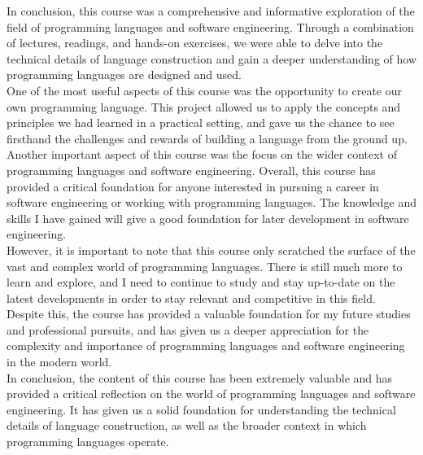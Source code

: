 \documentclass{article}
\theoremstyle{theorem}
\theoremstyle{definition}
\theoremstyle{remark}
\begin{document}
\indent	
In conclusion, this course was a comprehensive and informative exploration of the field of programming languages and software engineering. Through a combination of lectures, readings, and hands-on exercises, we were able to delve into the technical details of language construction and gain a deeper understanding of how programming languages are designed and used.
\\
\indent One of the most useful aspects of this course was the opportunity to create our own programming language. This project allowed us to apply the concepts and principles we had learned in a practical setting, and gave us the chance to see firsthand the challenges and rewards of building a language from the ground up.
Another important aspect of this course was the focus on the wider context of programming languages and software engineering.
Overall, this course has provided a critical foundation for anyone interested in pursuing a career in software engineering or working with programming languages. The knowledge and skills I have gained will give a good foundation for later development in software engineering.
	\\
 \indent
However, it is important to note that this course only scratched the surface of the vast and complex world of programming languages. There is still much more to learn and explore, and I need to continue to study and stay up-to-date on the latest developments in order to stay relevant and competitive in this field.
\\
	\indent
Despite this, the course has provided a valuable foundation for my future studies and 	professional pursuits, and has given us a deeper appreciation for the complexity and importance of programming languages and software engineering in the modern world.
\\
\indent
In conclusion, the content of this course has been extremely valuable and has provided a critical reflection on the world of programming languages and software engineering. It has given us a solid foundation for understanding the technical details of language construction, as well as the broader context in which programming languages operate. 
\end{document}
